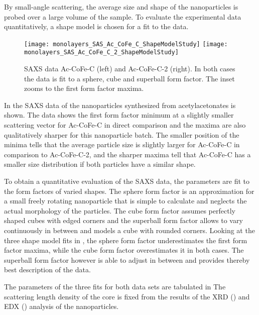 \documentclass[\main/dresen_thesis.tex]{subfiles}
\begin{document}
  \label{sec:monolayers:nanoparticle:sas}

  By small-angle scattering, the average size and shape of the nanoparticles is probed over a large volume of the sample.
  To evaluate the experimental data quantitatively, a shape model is chosen for a fit to the data.

  \begin{figure}[tb]
    \centering
    \texttt{[image: monolayers\_SAS\_Ac\_CoFe\_C\_ShapeModelStudy]}
    \texttt{[image: monolayers\_SAS\_Ac\_CoFe\_C\_2\_ShapeModelStudy]}
    \caption{\label{fig:monolayers:nanoparticle:sas:AcAcCoFeC}SAXS data Ac-CoFe-C (left) and Ac-CoFe-C-2 (right). In both cases the data is fit to a sphere, cube and superball form factor. The inset zooms to the first form factor maxima.}
  \end{figure}

    In  the SAXS data of the nanoparticles synthesized from acetylacetonates is shown.
    The data shows the first form factor minimum at a slightly smaller scattering vector for Ac-CoFe-C in direct comparison and the maxima are also qualitatively sharper for this nanoparticle batch.
    The smaller position of the minima tells that the average particle size is slightly larger for Ac-CoFe-C in comparison to Ac-CoFe-C-2, and the sharper maxima tell that Ac-CoFe-C has a smaller size distribution if both particles have a similar shape.

    To obtain a quantitative evaluation of the SAXS data, the parameters are fit to the form factors of varied shapes.
    The sphere form factor is an approximation for a small freely rotating nanoparticle that is simple to calculate and neglects the actual morphology of the particles.
    The cube form factor assumes perfectly shaped cubes with edged corners and the superball form factor allows to vary continuously in between and models a cube with rounded corners.
    Looking at the three shape model fits in , the sphere form factor underestimates the first form factor maxima, while the cube form factor overestimates it in both cases.
    The superball form factor however is able to adjust in between and provides thereby best description of the data.

    The parameters of the three fits for both data sets are tabulated in 
    The scattering length density of the core is fixed from the results of the XRD () and EDX () analysis of the nanoparticles.
\end{document}
